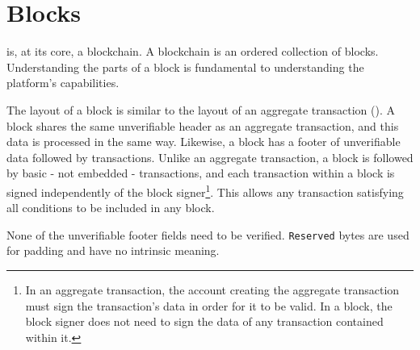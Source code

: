 \section{Blocks}
\label{sec:blocks}

\nemquote{
}{}

\codenamechapterfirstword is, at its core, a blockchain.
A blockchain is an ordered collection of blocks.
Understanding the parts of a \codenamespace block is fundamental to understanding the platform's capabilities.

The layout of a block is similar to the layout of an aggregate transaction ().
A block shares the same unverifiable header as an aggregate transaction, and this data is processed in the same way.
Likewise, a block has a footer of unverifiable data followed by transactions.
Unlike an aggregate transaction, a block is followed by basic - not embedded - transactions, and each transaction within a block is signed independently of the block signer\footnote{
In an aggregate transaction, the account creating the aggregate transaction must sign the transaction's data in order for it to be valid.
In a block, the block signer does not need to sign the data of any transaction contained within it.
}.
This allows any transaction satisfying all conditions to be included in any block.

None of the unverifiable footer fields need to be verified.
\texttt{Reserved} bytes are used for padding and have no intrinsic meaning.

